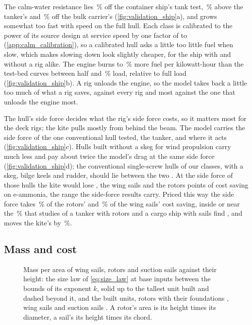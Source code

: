 The calm-water resistance lies \NumTankGapKcs\,\% off the container ship's tank test, \NumTankGapTanker\,\% above the tanker's and \NumTankGapJbc\,\% off the bulk carrier's (\cref{fig:validation_ship}a), and grows somewhat too fast with speed on the full hull. Each class is calibrated to the power of its source design at service speed by one factor of  to  (\cref{app:calm_calibration}), so a calibrated hull asks a little too little fuel when slow, which makes slowing down look slightly cheaper, for the ship with and without a rig alike. The engine burns  to \,\% more fuel per kilowatt-hour than the test-bed curves between half and \,\% load, relative to full load (\cref{fig:validation_ship}b). A rig unloads the engine, so the model takes back a little too much of what a rig saves, against every rig and most against the one that unloads the engine most.

The hull's side force decides what the rig's side force costs, so it matters most for the deck rigs; the kite pulls mostly from behind the beam. The model carries the side force of the one conventional hull tested, the tanker, and where it acts (\cref{fig:validation_ship}c). Hulls built without a skeg for wind propulsion carry much less and pay about twice the model's drag at the same side force (\cref{fig:validation_ship}d); the conventional single-screw hulls of our classes, with a skeg, bilge keels and rudder, should lie between the two \citep{vanderkolk2021}. At the side force of those hulls the kite would lose \NumWeakHullKite, the wing sails \NumWeakHullWings{} and the rotors \NumWeakHullRotors{} points of cost saving on e-ammonia, the range the side-force results carry. Priced this way the side force takes \NumSideForceRotors\,\% of the rotors' and \NumSideForceWings\,\% of the wing sails' cost saving, inside or near the \,\% that studies of a tanker with rotors and a cargo ship with sails find \citep{tillig2019,kramer2022}, and moves the kite's by \NumSideForceKite\,\%.

\subsection{Mass and cost}
\label{sec:val_mass}
\label{sec:val_cost}

\begin{figure}[tbp]
\centering
{}
\caption{Mass per area of wing sails, rotors and suction sails against their height: the size law of \cref{eq:size_law} at base inputs between the bounds of its exponent $k$, solid up to the tallest unit built and dashed beyond it, and the built units, rotors with their foundations \citep{norsepower2025}, wing sails \citep{oceanwings2026web,riviera2024windwing,oceanbird2026wing560} and suction sails \citep{conoship2022econowind,econowind2026vf3,econowind2026vf5}. A rotor's area is its height times its diameter, a sail's its height times its chord.}
\label{fig:deck_mass}
\end{figure}

